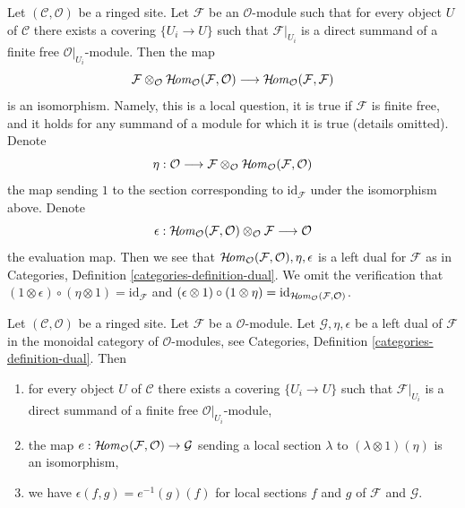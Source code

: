 \begin{example}
\label{example-dual}
Let $(\mathcal{C}, \mathcal{O})$ be a ringed site. Let $\mathcal{F}$
be an $\mathcal{O}$-module such that for every object $U$ of $\mathcal{C}$
there exists a covering $\{U_i \to U\}$ such that $\mathcal{F}|_{U_i}$
is a direct summand of a finite free $\mathcal{O}|_{U_i}$-module.
Then the map
$$
\mathcal{F} \otimes_\mathcal{O}
\mathop{\mathcal{H}\!\mathit{om}}\nolimits_\mathcal{O}(\mathcal{F}, \mathcal{O})
\longrightarrow
\mathop{\mathcal{H}\!\mathit{om}}\nolimits_\mathcal{O}(\mathcal{F}, \mathcal{F})
$$
is an isomorphism. Namely, this is a local question, it is true
if $\mathcal{F}$ is finite free, and it holds for any summand
of a module for which it is true (details omitted). Denote
$$
\eta :
\mathcal{O}
\longrightarrow
\mathcal{F} \otimes_\mathcal{O}
\mathop{\mathcal{H}\!\mathit{om}}\nolimits_\mathcal{O}(\mathcal{F}, \mathcal{O})
$$
the map sending $1$ to the section corresponding to
$\text{id}_\mathcal{F}$ under the isomorphism above.
Denote
$$
\epsilon : 
\mathop{\mathcal{H}\!\mathit{om}}\nolimits_\mathcal{O}(\mathcal{F}, \mathcal{O})
\otimes_\mathcal{O} \mathcal{F}
\longrightarrow
\mathcal{O}
$$
the evaluation map. Then we see that
$\mathop{\mathcal{H}\!\mathit{om}}\nolimits_\mathcal{O}(\mathcal{F}, \mathcal{O}), \eta, \epsilon$
is a left dual for $\mathcal{F}$ as in
Categories, Definition \ref{categories-definition-dual}.
We omit the verification that
$(1 \otimes \epsilon) \circ (\eta \otimes 1) = \text{id}_\mathcal{F}$
and
$(\epsilon \otimes 1) \circ (1 \otimes \eta) =
\text{id}_{\mathop{\mathcal{H}\!\mathit{om}}\nolimits_\mathcal{O}(\mathcal{F}, \mathcal{O})}$.
\end{example}

\begin{lemma}
\label{lemma-left-dual-module}
Let $(\mathcal{C}, \mathcal{O})$ be a ringed site. Let $\mathcal{F}$ be a
$\mathcal{O}$-module. Let $\mathcal{G}, \eta, \epsilon$
be a left dual of $\mathcal{F}$ in the monoidal category of
$\mathcal{O}$-modules, see
Categories, Definition \ref{categories-definition-dual}. Then
\begin{enumerate}
\item for every object $U$ of $\mathcal{C}$
there exists a covering $\{U_i \to U\}$ such that $\mathcal{F}|_{U_i}$
is a direct summand of a finite free $\mathcal{O}|_{U_i}$-module,
\item the map
$e : \mathop{\mathcal{H}\!\mathit{om}}\nolimits_\mathcal{O}(\mathcal{F}, \mathcal{O}) \to \mathcal{G}$
sending a local section $\lambda$ to $(\lambda \otimes 1)(\eta)$
is an isomorphism,
\item we have $\epsilon(f, g) = e^{-1}(g)(f)$ for local sections
$f$ and $g$ of $\mathcal{F}$ and $\mathcal{G}$.
\end{enumerate}
\end{lemma}

